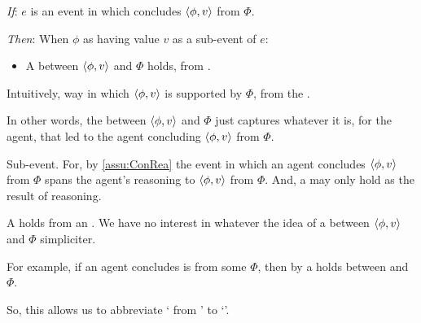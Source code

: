 \begin{note}
  \begin{idea}[\supportI{}]
    \label{idea:support}
    \vspace{-\baselineskip}
    \begin{itenum}
    \item[\emph{If}:]
      \(e\) is an event in which \vAgent{} concludes \(\langle \phi, v \rangle\) from \(\Phi\).
    \item[\emph{Then}:]
      When \vAgent{}  \(\phi\) as having value \(v\) as a sub-event of \(e\):
      \begin{itemize}
      \item
        A \emph{\ros{}} between \(\langle \phi, v \rangle\) and \(\Phi\) holds, from .
      \end{itemize}
    \end{itenum}
    \vspace{-\baselineskip}
  \end{idea}

  Intuitively, way in which \(\langle \phi, v \rangle\) is supported by \(\Phi\), from the \agpe{}.

  In other words, the \ros{} between \(\langle \phi, v \rangle\) and \(\Phi\) just captures whatever it is, for the agent, that led to the agent concluding \(\langle \phi, v \rangle\) from \(\Phi\).
\end{note}

\begin{note}
  Sub-event.
  For, by \autoref{assu:ConRea} the event in which an agent concludes \(\langle \phi, v \rangle\) from \(\Phi\) spans the agent's reasoning to \(\langle \phi, v \rangle\) from \(\Phi\).
  And, a \ros{} may only hold as the result of reasoning.
\end{note}

\begin{note}
  A \ros{} holds from an \agpe{}.
  We have no interest in whatever the idea of a \ros{} between \(\langle \phi, v \rangle\) and \(\Phi\) simpliciter.

  For example, if an agent concludes  is  from some \pool{} \(\Phi\), then by \supportI{} a \ros{} holds between  and \(\Phi\).

  {
    \color{red}
    So, this allows us to abbreviate `\ros{} from \agpe{}' to `\ros{}'.
  }
\end{note}

